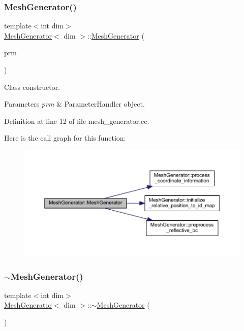 \subsubsection{\texorpdfstring{Mesh\+Generator()}{MeshGenerator()}}
{\footnotesize\ttfamily template$<$int dim$>$ \\
\hyperlink{class_mesh_generator}{Mesh\+Generator}$<$ dim $>$\+::\hyperlink{class_mesh_generator}{Mesh\+Generator} (\begin{DoxyParamCaption}\item[{Parameter\+Handler \&}]{prm }\end{DoxyParamCaption})}

Class constructor.


\begin{DoxyParams}{Parameters}
{\em prm} & Parameter\+Handler object. \\
\hline
\end{DoxyParams}


Definition at line 12 of file mesh\+\_\+generator.\+cc.

Here is the call graph for this function\+:\nopagebreak
\begin{figure}[H]
\begin{center}
\leavevmode
\includegraphics[width=350pt]{class_mesh_generator_aaf711e4f4d1702dd2f91b8dc3d425765_cgraph}
\end{center}
\end{figure}
\mbox{\label{class_mesh_generator_aa8a590f00d9732424e56f54bcc2b6339}} 
\subsubsection{\texorpdfstring{$\sim$\+Mesh\+Generator()}{~MeshGenerator()}}
{\footnotesize\ttfamily template$<$int dim$>$ \\
\hyperlink{class_mesh_generator}{Mesh\+Generator}$<$ dim $>$\+::$\sim$\hyperlink{class_mesh_generator}{Mesh\+Generator} (\begin{DoxyParamCaption}{ }\end{DoxyParamCaption})}



